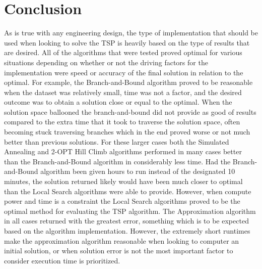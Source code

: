 \documentclass[format=sigconf]{acmart}
\begin{document}
\section*{Conclusion}
As is true with any engineering design, the type of implementation that should be used when looking to solve the TSP is heavily based on the type of results that are desired. All 
of the algorithms that were tested proved optimal for various situations depending on whether or not the driving factors for the implementation were speed or accuracy of the final solution 
in relation to the optimal. For example, the Branch-and-Bound algorithm proved to be reasonable when the dataset was relatively small, time was not a factor, and the desired outcome was to obtain a solution 
close or equal to the optimal. When the solution space ballooned the branch-and-bound did not provide as good of results compared to the extra time that it took to traverse the solution space, often becoming stuck 
traversing branches which in the end proved worse or not much better than previous solutions. For these larger cases both the Simulated Annealing and 2-OPT Hill Climb algorithms performed in many cases better than the Branch-and-Bound 
algorithm in considerably less time. Had the Branch-and-Bound algorithm been given hours to run instead of the designated 10 minutes, the solution returned likely would have been much closer to optimal than the Local Search algorithms were able 
to provide. However, when compute power and time is a constraint the Local Search algorithms proved to be the optimal method for evaluating the TSP algorithm. The Approximation algorithm in all cases returned with the greatest error, something 
which is to be expected based on the algorithm implementation. However, the extremely short runtimes make the approximation algorithm reasonable when looking to computer an initial solution, or when solution error is not the most important factor to consider 
execution time is prioritized.


\end{document}
